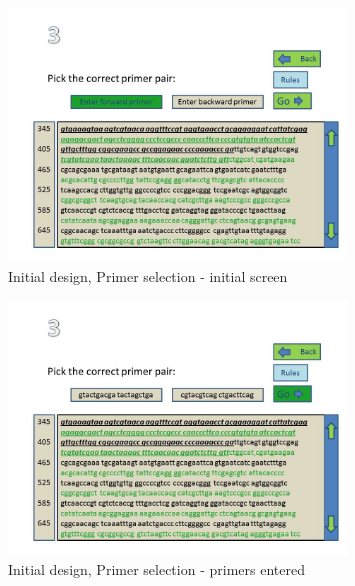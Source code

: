 \begin{frame}

\begin{figure}[h]
  \begin{center}
	\includegraphics[width=0.8\textwidth]{./img/UiDes/slide3.jpg}
    \caption{
      \label{fig:UiDes:slide3}
      Initial design, Primer selection - initial screen
    }
  \end{center}
\end{figure}

\end{frame}

\begin{frame}

\begin{figure}[h]
  \begin{center}
	\includegraphics[width=0.8\textwidth]{./img/UiDes/Slide4.JPG}
    \caption{
      \label{fig:UiDes:slide4}
      Initial design, Primer selection - primers entered
    }
  \end{center}
\end{figure}

\end{frame}

